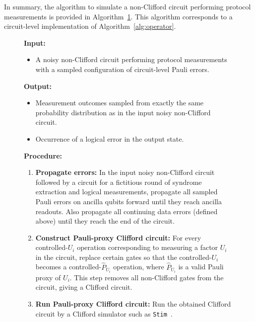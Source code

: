 \documentclass[
 reprint,
 amsmath,amssymb,
 pra,superscriptaddress, nofootinbib
]{revtex4-2}
\theoremstyle{definition}
\theoremstyle{plain}
\begin{document}
In summary, the algorithm to simulate a non-Clifford circuit performing protocol measurements is provided in Algorithm~\ref{alg:circuit}. 
This algorithm corresponds to a circuit-level implementation of Algorithm~\ref{alg:operator}.
%
\begin{figure}[tb]
\normalsize
\begin{algorithm}\label{alg:circuit}
\leavevmode\par
\medskip
\noindent\textbf{Input:}\par
\noindent

\begin{itemize}
    \item A noisy non-Clifford circuit performing protocol measurements with a sampled configuration of circuit-level Pauli errors.
\end{itemize}

\noindent\textbf{Output:}\par
\noindent
\begin{itemize}
    \item Measurement outcomes sampled from exactly the same probability distribution as in the input noisy non-Clifford circuit.
    \item Occurrence of a logical error in the output state.
\end{itemize}

\noindent\textbf{Procedure:}\par
\begin{enumerate}[label=\textbf{\arabic*.}]
  \item \textbf{Propagate errors:} In the input noisy non-Clifford circuit followed by a circuit for a fictitious round of syndrome extraction and logical measurements, propagate all sampled Pauli errors on ancilla qubits forward until they reach ancilla readouts. Also propagate all continuing data errors (defined above) until they reach the end of the circuit. 
  \item \textbf{Construct Pauli-proxy Clifford circuit:} For every controlled-$U_i$ operation corresponding to measuring a factor $U_i$ in the circuit, replace certain gates so that the controlled-$U_i$ becomes a controlled-$\hat{P}_{U_i}$ operation, where $\hat{P}_{U_i}$ is a valid Pauli proxy of $U_i$. This step removes all non-Clifford gates from the circuit, giving a Clifford circuit.
  \item \textbf{Run Pauli-proxy Clifford circuit:} Run the obtained Clifford circuit by a Clifford simulator such as \texttt{Stim}~\cite{Gidney2021stimfaststabilizer}.
\end{enumerate}
\end{algorithm}
\end{figure}
%
\end{document}
